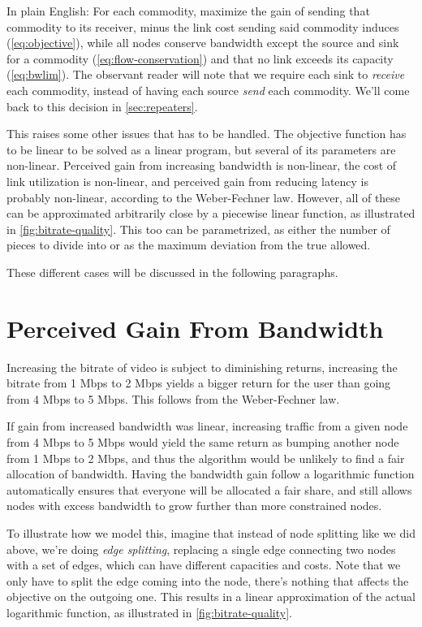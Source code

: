 In plain English: For each commodity, maximize the gain of sending that commodity to its receiver, minus the link cost sending said commodity induces (\autoref{eq:objective}), while all nodes conserve bandwidth except the source and sink for a commodity (\autoref{eq:flow-conservation}) and that no link exceeds its capacity (\autoref{eq:bwlim}). The observant reader will note that we require each sink to \emph{receive} each commodity, instead of having each source \emph{send} each commodity. We'll come back to this decision in \autoref{sec:repeaters}.

This raises some other issues that has to be handled. The objective function has to be linear to be solved as a linear program, but several of its parameters are non-linear. Perceived gain from increasing bandwidth is non-linear, the cost of link utilization is non-linear, and perceived gain from reducing latency is probably non-linear, according to the Weber-Fechner law. However, all of these can be approximated arbitrarily close by a piecewise linear function, as illustrated in \autoref{fig:bitrate-quality}. This too can be parametrized, as either the number of pieces to divide into or as the maximum deviation from the true allowed.

These different cases will be discussed in the following paragraphs.


\section{Perceived Gain From Bandwidth}

Increasing the bitrate of video is subject to diminishing returns, increasing the bitrate from 1 Mbps to 2 Mbps yields a bigger return for the user than going from 4 Mbps to 5 Mbps. This follows from the Weber-Fechner law.

If gain from increased bandwidth was linear, increasing traffic from a given node from 4 Mbps to 5 Mbps would yield the same return as bumping another node from 1 Mbps to 2 Mbps, and thus the algorithm would be unlikely to find a fair allocation of bandwidth. Having the bandwidth gain follow a logarithmic function automatically ensures that everyone will be allocated a fair share, and still allows nodes with excess bandwidth to grow further than more constrained nodes.

To illustrate how we model this, imagine that instead of node splitting like we did above, we're doing \emph{edge splitting}, replacing a single edge connecting two nodes with a set of edges, which can have different capacities and costs. Note that we only have to split the edge coming into the node, there's nothing that affects the objective on the outgoing one. This results in a linear approximation of the actual logarithmic function, as illustrated in \autoref{fig:bitrate-quality}.

